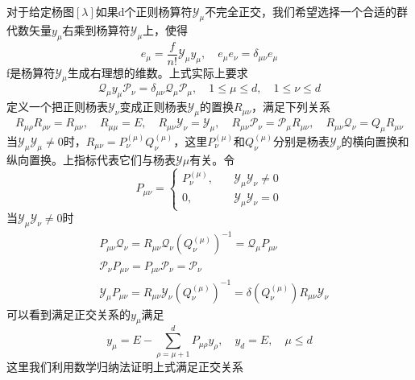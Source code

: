 \documentclass[12pt]{article}
\begin{document}
对于给定杨图$[\lambda]$如果d个正则杨算符$\mathcal{Y}_\mu$不完全正交，我们希望选择一个合适的群代数矢量$y_\mu$右乘到杨算符$\mathcal{Y}_\mu$上，使得
\begin{equation*}
    e_\mu=\frac{f}{n!}\mathcal{Y}_\mu y_\mu,\quad e_\mu e_\nu=\delta_{\mu\nu}e_\mu
\end{equation*}
f是杨算符$\mathcal{Y}_\mu$生成右理想的维数。上式实际上要求
\begin{equation*}
    \mathcal{Q}_\mu y_\mu\mathcal{P}_\nu=\delta_{\mu\nu}\mathcal{Q}_\mu\mathcal{P}_\mu,\quad 1\leq\mu\leq d,\quad1\leq\nu\leq d
\end{equation*}
定义一个把正则杨表$\mathcal{Y}_\nu$变成正则杨表$\mathcal{Y}_\mu$的置换$R_{\mu\nu}$，满足下列关系
\begin{equation*}
    R_{\mu\rho}R_{\rho\nu}=R_{\mu\nu},\quad R_{\mu\mu}=E,\quad R_{\mu\nu}\mathcal{Y}_\nu=\mathcal{Y}_\mu,\quad R_{\mu\nu}\mathcal{P}_\nu=\mathcal{P}_\mu R_{\mu\nu},\quad R_{\mu\nu}\mathcal{Q}_\nu=Q_\mu R_{\mu\nu}
\end{equation*}
当$\mathcal{Y}_\mu\mathcal{Y}_\mu\neq0$时，$R_{\mu\nu}=P_{\nu}^{(\mu)}Q_\nu^{(\mu)}$，这里$P_\nu^{(\mu)}$和$Q_\nu^{(\mu)}$分别是杨表$\mathcal{Y}_\nu$的横向置换和纵向置换。上指标代表它们与杨表$\mathcal{Y}\mu$有关。令
\begin{equation*}
    P_{\mu\nu}=\begin{cases}
        P_\nu^{(\mu)},\quad&\mathcal{Y}_\mu\mathcal{Y}_\nu\neq0\\
        0,\quad&\mathcal{Y}_\mu\mathcal{Y}_\nu=0
    \end{cases}
\end{equation*}
当$\mathcal{Y}_\mu\mathcal{Y}_\nu\neq0$时
\begin{equation*}
    \begin{split}
        &P_{\mu\nu}\mathcal{Q}_\nu=R_{\mu\nu}\mathcal{Q}_\nu(Q_\nu^{(\mu)})^{-1}=\mathcal{Q}_\mu P_{\mu\nu}\\
        &\mathcal{P}_\nu P_{\mu\nu}=P_{\mu\nu}\mathcal{P}_\nu=\mathcal{P}_\nu\\
        &\mathcal{Y}_\mu P_{\mu\nu}=R_{\mu\nu}\mathcal{Y}_\nu(Q_\nu^{(\mu)})^{-1}=\delta(Q_\nu^{(\mu)})R_{\mu\nu}\mathcal{Y}_\nu
    \end{split}
\end{equation*}
可以看到满足正交关系的$y_\mu$满足
\begin{equation*}
    y_\mu=E-\sum_{\rho=\mu+1}^{d}P_{\mu\rho}y_\rho,\quad y_d=E,\quad\mu\leq d
\end{equation*}
这里我们利用数学归纳法证明上式满足正交关系
\end{document}
